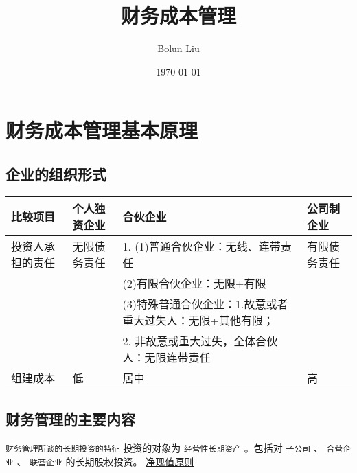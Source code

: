 \documentclass[11pt]{article}
\author{Bolun Liu}
\date{\today}
\title{财务成本管理}
\begin{document}
\maketitle
\tableofcontents

\section{财务成本管理基本原理}
\label{sec:org10fa438}
\subsection{企业的组织形式}
\label{sec:org99b4330}
\begin{center}
\begin{tabular}{llll}
比较项目 & 个人独资企业 & 合伙企业 & 公司制企业\\
\hline
投资人承担的责任 & 无限债务责任 & 1. (1)普通合伙企业：无线、连带责任 & 有限债务责任\\
 &  & (2)有限合伙企业：无限+有限 & \\
 &  & (3)特殊普通合伙企业：1.故意或者重大过失人：无限+其他有限； & \\
 &  & 2. 非故意或重大过失，全体合伙人：无限连带责任 & \\
\hline
组建成本 & 低 & 居中 & 高\\
\end{tabular}
\end{center}
\subsection{财务管理的主要内容}
\label{sec:org1ff2da5}
\texttt{财务管理所谈的长期投资的特征} 投资的对象为 \texttt{经营性长期资产} 。包括对 \texttt{子公司} 、 \texttt{合营企业} 、 \texttt{联营企业} 的长期股权投资。
\uline{净现值原则}
\end{document}
